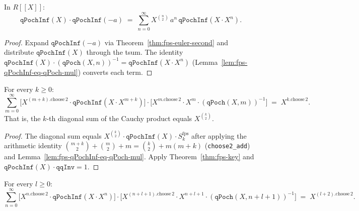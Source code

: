\begin{lemma}\label{lem:fps-qqInf-euler2}\leanok{}
In $R[\![ X]\!]$:
\[
  \texttt{qPochInf}(X)\cdot\texttt{qPochInf}(-a)
  \;=\; \sum_{n=0}^{\infty} X^{\binom{n}{2}}\,a^n\,
        \texttt{qPochInf}(X \cdot X^n).
\]
\end{lemma}

\begin{proof}\leanok
Expand $\texttt{qPochInf}(-a)$ via Theorem~\ref{thm:fps-euler-second} and distribute
$\texttt{qPochInf}(X)$ through the tsum. The identity
$\texttt{qPochInf}(X)\cdot(\texttt{qPoch}(X,n))^{-1} = \texttt{qPochInf}(X\cdot X^n)$
(Lemma~\ref{lem:fps-qPochInf-eq-qPoch-mul}) converts each term.
\end{proof}

\begin{theorem}\label{thm:fps-cauchy-nonneg}\leanok{}
For every $k \ge 0$:
\[
  \sum_{m=0}^{\infty}
    \bigl[X^{(m+k)\text{.choose}\,2}\cdot\texttt{qPochInf}(X\cdot X^{m+k})\bigr]
    \cdot
    \bigl[X^{m\text{.choose}\,2}\cdot X^m \cdot (\texttt{qPoch}(X,m))^{-1}\bigr]
  \;=\; X^{k\text{.choose}\,2}.
\]
That is, the $k$-th diagonal sum of the Cauchy product equals $X^{\binom{k}{2}}$.
\end{theorem}

\begin{proof}\leanok
The diagonal sum equals $X^{\binom{k}{2}}\cdot\texttt{qPochInf}(X)\cdot S^{\mathrm{fps}}_k$
after applying the arithmetic identity
$\binom{m+k}{2} + \binom{m}{2} + m = \binom{k}{2} + m(m+k)$
(\texttt{choose2\_add}) and Lemma~\ref{lem:fps-qPochInf-eq-qPoch-mul}.
Apply Theorem~\ref{thm:fps-key} and $\texttt{qPochInf}(X)\cdot\texttt{qqInv} = 1$.
\end{proof}

\begin{theorem}\label{thm:fps-cauchy-neg}\leanok{}
For every $l \ge 0$:
\[
  \sum_{n=0}^{\infty}
    \bigl[X^{n\text{.choose}\,2}\cdot\texttt{qPochInf}(X\cdot X^n)\bigr]
    \cdot
    \bigl[X^{(n+l+1)\text{.choose}\,2}\cdot X^{n+l+1} \cdot
          (\texttt{qPoch}(X,n+l+1))^{-1}\bigr]
  \;=\; X^{(l+2)\text{.choose}\,2}.
\]
\end{theorem}

